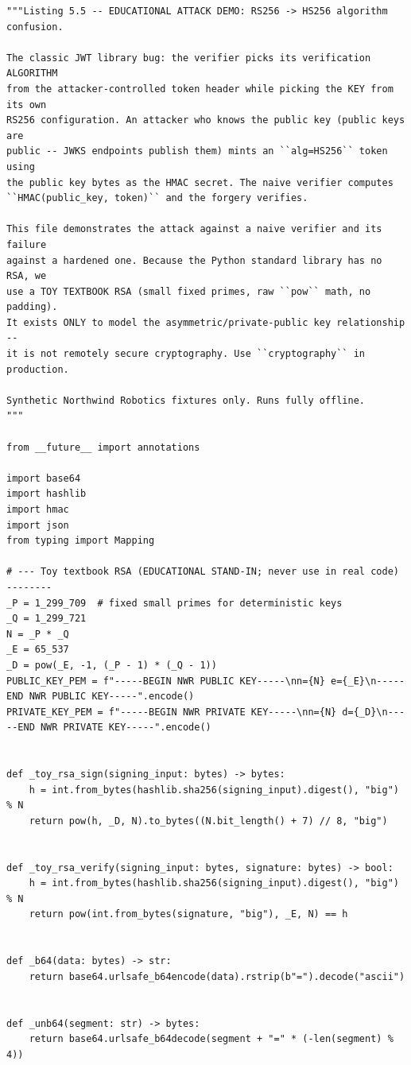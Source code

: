 \begin{verbatim}
"""Listing 5.5 -- EDUCATIONAL ATTACK DEMO: RS256 -> HS256 algorithm confusion.

The classic JWT library bug: the verifier picks its verification ALGORITHM
from the attacker-controlled token header while picking the KEY from its own
RS256 configuration. An attacker who knows the public key (public keys are
public -- JWKS endpoints publish them) mints an ``alg=HS256`` token using
the public key bytes as the HMAC secret. The naive verifier computes
``HMAC(public_key, token)`` and the forgery verifies.

This file demonstrates the attack against a naive verifier and its failure
against a hardened one. Because the Python standard library has no RSA, we
use a TOY TEXTBOOK RSA (small fixed primes, raw ``pow`` math, no padding).
It exists ONLY to model the asymmetric/private-public key relationship --
it is not remotely secure cryptography. Use ``cryptography`` in production.

Synthetic Northwind Robotics fixtures only. Runs fully offline.
"""

from __future__ import annotations

import base64
import hashlib
import hmac
import json
from typing import Mapping

# --- Toy textbook RSA (EDUCATIONAL STAND-IN; never use in real code) --------
_P = 1_299_709  # fixed small primes for deterministic keys
_Q = 1_299_721
N = _P * _Q
_E = 65_537
_D = pow(_E, -1, (_P - 1) * (_Q - 1))
PUBLIC_KEY_PEM = f"-----BEGIN NWR PUBLIC KEY-----\nn={N} e={_E}\n-----END NWR PUBLIC KEY-----".encode()
PRIVATE_KEY_PEM = f"-----BEGIN NWR PRIVATE KEY-----\nn={N} d={_D}\n-----END NWR PRIVATE KEY-----".encode()


def _toy_rsa_sign(signing_input: bytes) -> bytes:
    h = int.from_bytes(hashlib.sha256(signing_input).digest(), "big") % N
    return pow(h, _D, N).to_bytes((N.bit_length() + 7) // 8, "big")


def _toy_rsa_verify(signing_input: bytes, signature: bytes) -> bool:
    h = int.from_bytes(hashlib.sha256(signing_input).digest(), "big") % N
    return pow(int.from_bytes(signature, "big"), _E, N) == h


def _b64(data: bytes) -> str:
    return base64.urlsafe_b64encode(data).rstrip(b"=").decode("ascii")


def _unb64(segment: str) -> bytes:
    return base64.urlsafe_b64decode(segment + "=" * (-len(segment) % 4))



\end{verbatim}
